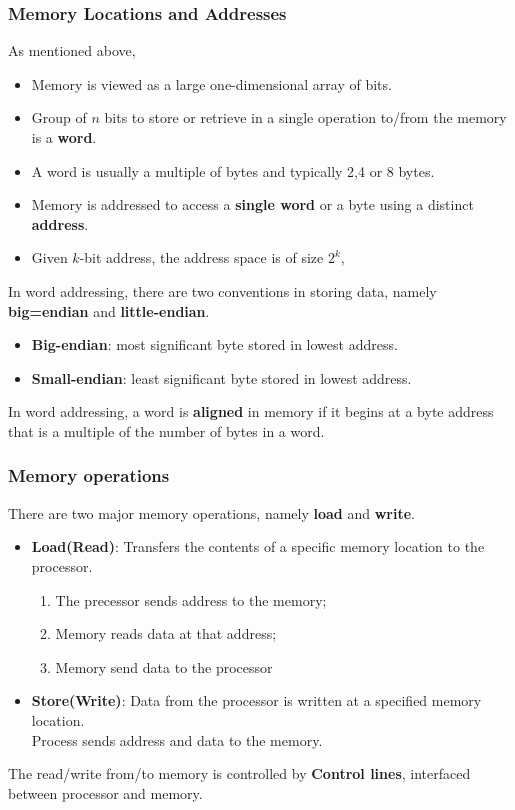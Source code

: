 \documentclass[12pt]{article}
\theoremstyle{definition}
\begin{document}
\subsubsection{Memory Locations and Addresses}
As mentioned above,
\begin{itemize}
  \item Memory is viewed as a large one-dimensional array of bits.
  \item Group of $n$ bits to store or retrieve in a single operation to/from the memory is a \textbf{word}.
  \item A word is usually a multiple of bytes and typically 2,4 or 8 bytes.
  \item Memory is addressed to access a \textbf{single word} or a byte using a distinct \textbf{address}.
  \item Given $k$-bit address, the address space is of size $2^k$,
\end{itemize}
In word addressing, there are two conventions in storing data, namely \textbf{big=endian} and \textbf{little-endian}.
\begin{itemize}
  \item \textbf{Big-endian}: most significant byte stored in lowest address.
  \item \textbf{Small-endian}: least significant byte stored in lowest address.
\end{itemize}
In word addressing, a word is \textbf{aligned} in memory if it begins at a byte address that is a multiple of the number of bytes in a word.
\subsubsection{Memory operations}
There are two major memory operations, namely \textbf{load} and \textbf{write}.
\begin{itemize}
  \item \textbf{Load(Read)}: Transfers the contents of a specific memory location to the processor.
  \begin{enumerate}\item The precessor sends address to the memory; \item Memory reads data at that address; \item Memory send data to the processor\end{enumerate}
  \item \textbf{Store(Write)}: Data from the processor is written at a specified memory location.\\Process sends address and data to the memory.
\end{itemize} 
The read/write from/to memory is controlled by \textbf{Control lines}, interfaced between processor and memory.
\end{document}
